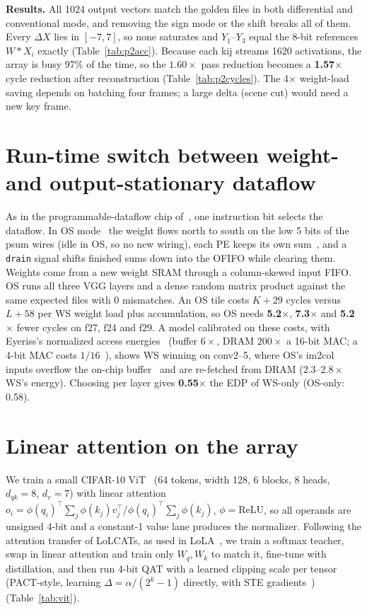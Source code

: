 \documentclass{article}
\newcommand{\code}[1]{\texttt{#1}}
\newcommand{\dX}{\Delta X}
\newcommand{\sld}[1]{\unskip~\cite[#1]{ece284slides}}
\begin{document}
\textbf{Results.} All 1024 output vectors match the golden files in both differential and conventional mode, and removing the
sign mode or the shift breaks all of them. Every $\dX$ lies in $[-7,7]$, so none saturates and $Y_1$--$Y_3$ equal the 8-bit
references $W*X_i$ exactly (Table~\ref{tab:p2acc}). Because each kij streams 1620 activations, the array is busy 97\% of the time, so
the $1.60\times$ pass reduction becomes a \textbf{1.57$\times$} cycle reduction after reconstruction (Table~\ref{tab:p2cycles}).
The 4$\times$ weight-load saving depends on batching four frames; a large delta (scene cut) would need a new key frame.

\section{Run-time switch between weight- and output-stationary dataflow}
\label{sec:os}
As in the programmable-dataflow chip of\sld{Ch7:p32}, one instruction bit selects the dataflow. In OS mode\sld{Ch7:p25--31} the weight flows north to south on the low 5 bits of the psum wires (idle in
OS, so no new wiring), each PE keeps its own sum\sld{Ch9:p10--13}, and a \code{drain} signal shifts finished sums down into the OFIFO while
clearing them. Weights come from a new weight SRAM through a column-skewed input FIFO. OS runs all three VGG layers and a dense
random matrix product against the same expected files with 0 mismatches. An OS tile costs $K+29$ cycles versus $L+58$ per WS
weight load plus accumulation, so OS needs \textbf{5.2$\times$}, \textbf{7.3$\times$} and \textbf{5.2$\times$} fewer cycles on
f27, f24 and f29. A model calibrated on these costs, with Eyeriss's normalized access energies~\cite{chen2016eyeriss} (buffer
$6\times$, DRAM $200\times$ a 16-bit MAC; a 4-bit MAC costs $1/16$\sld{Ch5:p14}), shows WS winning on conv2--5, where OS's
im2col inputs overflow the on-chip buffer\sld{Ch8:p26} and are re-fetched from DRAM ($2.3$--$2.8\times$ WS's energy).
Choosing per layer gives \textbf{0.55$\times$} the EDP of WS-only (OS-only: 0.58).

\section{Linear attention on the array}
\label{sec:attn}
We train a small CIFAR-10 ViT~\cite{dosovitskiy2021vit} (64 tokens, width 128, 6 blocks, 8 heads, $d_{qk}=8$, $d_v=7$) with
linear attention~\cite{katharopoulos2020linear} $o_i=\phi(q_i)^\top\sum_j\phi(k_j)v_j^\top/\phi(q_i)^\top\sum_j\phi(k_j)$, $\phi=\text{ReLU}$, so all operands
are unsigned 4-bit and a constant-1 value lane produces the normalizer. Following the attention transfer of LoLCATs, as used in LoLA~\cite{zhang2025lolcats,
mcdermott2026lola}, we train a softmax teacher, swap in linear attention and train only $W_q,W_k$ to match it, fine-tune with
distillation, and then run 4-bit QAT with a learned clipping scale per tensor (PACT-style, learning
$\Delta=\alpha/(2^k{-}1)$ directly, with STE gradients\sld{Ch6:p6--7, Ch7:p6--7}) (Table~\ref{tab:vit}).
\end{document}
